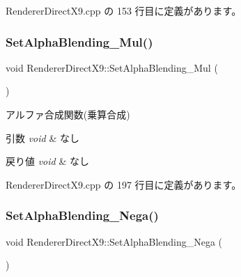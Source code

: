  Renderer\+Direct\+X9.\+cpp の 153 行目に定義があります。

\mbox{\label{class_renderer_direct_x9_a75dbeaa680610e655c6ff202591f50d7}} 
\subsubsection{\texorpdfstring{Set\+Alpha\+Blending\+\_\+\+Mul()}{SetAlphaBlending\_Mul()}}
{\footnotesize\ttfamily void Renderer\+Direct\+X9\+::\+Set\+Alpha\+Blending\+\_\+\+Mul (\begin{DoxyParamCaption}{ }\end{DoxyParamCaption})}



アルファ合成関数(乗算合成) 


\begin{DoxyParams}{引数}
{\em void} & なし \\
\hline
\end{DoxyParams}

\begin{DoxyRetVals}{戻り値}
{\em void} & なし \\
\hline
\end{DoxyRetVals}


 Renderer\+Direct\+X9.\+cpp の 197 行目に定義があります。

\mbox{\label{class_renderer_direct_x9_a5018efa829bf845405ac70beef7df947}} 
\subsubsection{\texorpdfstring{Set\+Alpha\+Blending\+\_\+\+Nega()}{SetAlphaBlending\_Nega()}}
{\footnotesize\ttfamily void Renderer\+Direct\+X9\+::\+Set\+Alpha\+Blending\+\_\+\+Nega (\begin{DoxyParamCaption}{ }\end{DoxyParamCaption})}



